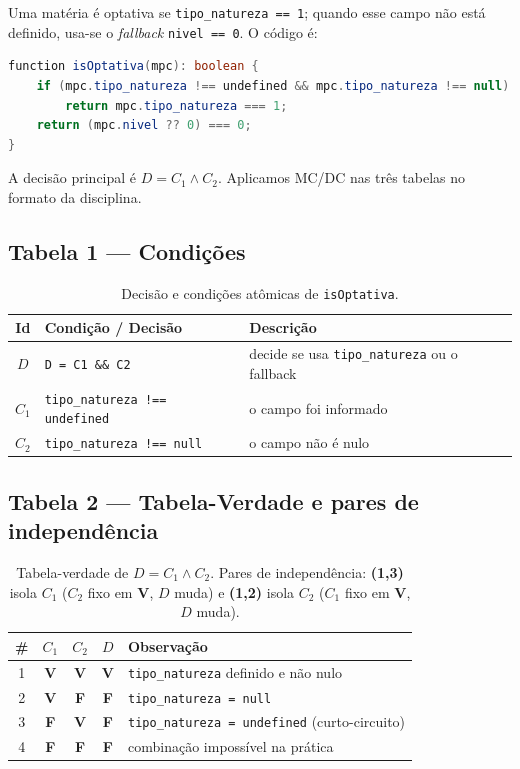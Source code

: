 \documentclass[11pt,a4paper]{article}
\newcommand{\V}{\textbf{V}}
\newcommand{\Ff}{\textbf{F}}
\begin{document}
Uma matéria é optativa se \texttt{tipo\_natureza == 1}; quando esse campo não
está definido, usa-se o \emph{fallback} \texttt{nivel == 0}. O código é:

\begin{lstlisting}[language=Java]
function isOptativa(mpc): boolean {
    if (mpc.tipo_natureza !== undefined && mpc.tipo_natureza !== null)
        return mpc.tipo_natureza === 1;
    return (mpc.nivel ?? 0) === 0;
}
\end{lstlisting}

A decisão principal é $D = C_1 \land C_2$. Aplicamos MC/DC nas três tabelas no
formato da disciplina.

\subsection*{Tabela 1 --- Condições}

\begin{table}[h]
\centering
\small
\begin{tabular}{@{}cll@{}}
\toprule
\textbf{Id} & \textbf{Condição / Decisão} & \textbf{Descrição} \\
\midrule
$D$   & \texttt{D = C1 \&\& C2}            & decide se usa \texttt{tipo\_natureza} ou o fallback \\
$C_1$ & \texttt{tipo\_natureza !== undefined} & o campo foi informado \\
$C_2$ & \texttt{tipo\_natureza !== null}      & o campo não é nulo \\
\bottomrule
\end{tabular}
\caption{Decisão e condições atômicas de \texttt{isOptativa}.}
\end{table}

\subsection*{Tabela 2 --- Tabela-Verdade e pares de independência}

\begin{table}[h]
\centering
\small
\begin{tabular}{@{}ccccl@{}}
\toprule
\textbf{\#} & $C_1$ & $C_2$ & $D$ & \textbf{Observação} \\
\midrule
1 & \V  & \V  & \V  & \texttt{tipo\_natureza} definido e não nulo \\
2 & \V  & \Ff & \Ff & \texttt{tipo\_natureza = null} \\
3 & \Ff & \V  & \Ff & \texttt{tipo\_natureza = undefined} (curto-circuito) \\
4 & \Ff & \Ff & \Ff & combinação impossível na prática \\
\bottomrule
\end{tabular}
\caption{Tabela-verdade de $D = C_1 \land C_2$. Pares de independência:
\textbf{(1,3)} isola $C_1$ ($C_2$ fixo em \V, $D$ muda) e
\textbf{(1,2)} isola $C_2$ ($C_1$ fixo em \V, $D$ muda).}
\end{table}
\end{document}
